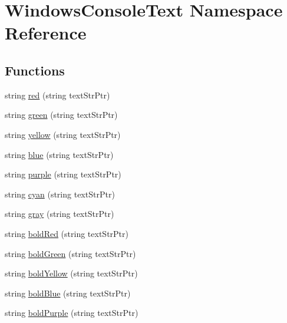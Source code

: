 \hypertarget{namespace_windows_console_text}{\section{Windows\-Console\-Text Namespace Reference}
\label{namespace_windows_console_text}
}
\subsection*{Functions}
\begin{DoxyCompactItemize}
\item 
string \hyperlink{namespace_windows_console_text_aa1fe0f1b83deb02cad2bda40ea8361b9}{red} (string text\-Str\-Ptr)
\item 
string \hyperlink{namespace_windows_console_text_a010dd4e1fc04a8e8e6db750a9603dc5b}{green} (string text\-Str\-Ptr)
\item 
string \hyperlink{namespace_windows_console_text_ae70c89bbc8fd9df308996adbd9a81679}{yellow} (string text\-Str\-Ptr)
\item 
string \hyperlink{namespace_windows_console_text_a434706da200be3a3f0cbdc0c06330f2d}{blue} (string text\-Str\-Ptr)
\item 
string \hyperlink{namespace_windows_console_text_abfc1d543e3502811f5ce74e0348124f9}{purple} (string text\-Str\-Ptr)
\item 
string \hyperlink{namespace_windows_console_text_a0cd99007708e3636ffbb80689ccbf4cf}{cyan} (string text\-Str\-Ptr)
\item 
string \hyperlink{namespace_windows_console_text_a8db88d107afe45b8c5df7df7c7ddc3da}{gray} (string text\-Str\-Ptr)
\item 
string \hyperlink{namespace_windows_console_text_a1a41ffef0b0f3813f2930d041d51da48}{bold\-Red} (string text\-Str\-Ptr)
\item 
string \hyperlink{namespace_windows_console_text_a7ba86be71d93877c49aad84bbb135a03}{bold\-Green} (string text\-Str\-Ptr)
\item 
string \hyperlink{namespace_windows_console_text_ab7d636ab77830286995421eca3f604d8}{bold\-Yellow} (string text\-Str\-Ptr)
\item 
string \hyperlink{namespace_windows_console_text_a3fa3501fac5f9b86d3125c41042e6481}{bold\-Blue} (string text\-Str\-Ptr)
\item 
string \hyperlink{namespace_windows_console_text_aaa625409ba4a8af8c0d706f99ad4bded}{bold\-Purple} (string text\-Str\-Ptr)
\item 

\end{DoxyCompactItemize}
